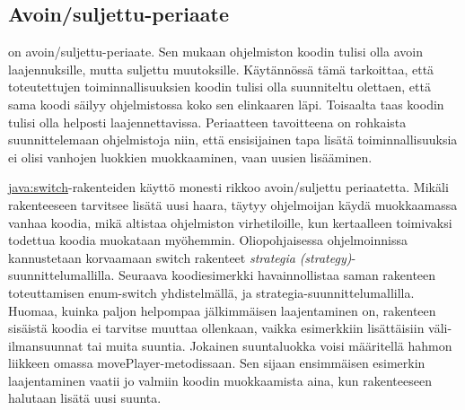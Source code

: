 \documentclass{tufte-book}
\newcommand{\eng}[1]{\textit{(#1)}}
\newcommand{\new}[1]{\textit{\gls{#1}}}
\newcommand{\neweng}[2]{\new{#1} \eng{#2}}
\newcommand{\java}[1]{\underline{\gls{java:#1}}}
\newcommand{\code}[3]{
\begin{listing}
    \inputminted{java}{OhjelmointiopasEsimerkit/src/#1/#2.java}
    \caption{#3}
    \label{Java-#1-#2}
\end{listing}
}
\begin{document}
\subsection{Avoin/suljettu-periaate}
\label{OCP}

 on \gls{avoin/suljettu-periaate}. Sen mukaan ohjelmiston
koodin tulisi olla avoin laajennuksille, mutta suljettu muutoksille. Käytännössä tämä tarkoittaa,
että toteutettujen toiminnallisuuksien koodin tulisi olla suunniteltu olettaen, että sama koodi
säilyy ohjelmistossa koko sen elinkaaren läpi. Toisaalta taas koodin tulisi olla helposti
laajennettavissa. Periaatteen tavoitteena on rohkaista suunnittelemaan ohjelmistoja niin, että
ensisijainen tapa lisätä toiminnallisuuksia ei olisi vanhojen luokkien muokkaaminen, vaan uusien
lisääminen.

 \java{switch}-rakenteiden käyttö monesti rikkoo 
avoin/suljettu periaatetta. Mikäli rakenteeseen tarvitsee lisätä uusi haara, täytyy ohjelmoijan
käydä muokkaamassa vanhaa koodia, mikä altistaa ohjelmiston virhetiloille, kun kertaalleen
toimivaksi todettua koodia muokataan myöhemmin. Oliopohjaisessa ohjelmoinnissa kannustetaan
korvaamaan switch rakenteet \neweng{strategia}{strategy}-suunnittelumallilla. Seuraava
koodiesimerkki havainnollistaa saman rakenteen toteuttamisen enum-switch yhdistelmällä, ja
strategia-suunnittelumallilla. Huomaa, kuinka paljon helpompaa jälkimmäisen laajentaminen on,
rakenteen sisäistä koodia ei tarvitse muuttaa ollenkaan, vaikka esimerkkiin lisättäisiin
väli-ilmansuunnat tai muita suuntia. Jokainen suuntaluokka voisi määritellä hahmon liikkeen
omassa movePlayer-metodissaan. Sen sijaan ensimmäisen esimerkin laajentaminen vaatii jo valmiin
koodin muokkaamista aina, kun rakenteeseen halutaan lisätä uusi suunta.

\code{week9/openclosedexample}{Player}{Pelaaja-luokka, jonka koordinaatteja esimerkissä pyritään
muuttamaan}
\code{week3/enumexample}{CompassPoint}{Ilmansuunnat \java{enum}-luokalla esiteltynä}
\code{week9/openclosedexample}{MoveSwitch}{Hahmon liikuttaminen \java{switch}-rakenteella ja
ilmansuuntia esittävällä \java{enum}-rakenteella}
\code{week9/openclosedexample}{MovementCommand}{Rajapintaluokka hahmon liikkuttamiseen
\gls{strategia}-suunnittelumallilla}
\code{week9/openclosedexample}{MoveNorth}{Liikkumiskomento pohjoiseen}
\code{week9/openclosedexample}{MoveEast}{Liikkumiskomento itään}
\code{week9/openclosedexample}{MoveSouth}{Liikkumiskomento etelään}
\code{week9/openclosedexample}{MoveWest}{Liikkumiskomento länteen}
\code{week9/openclosedexample}{MoveStrategy}{Hahmon liikuttaminen 
\gls{strategia}-suunnittelumallilla}
\end{document}
